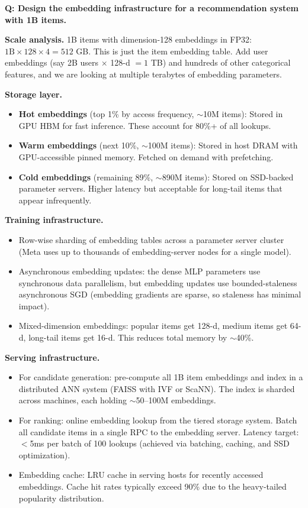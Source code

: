 \begin{interviewq}
\textbf{Q: Design the embedding infrastructure for a recommendation system with 1B items.}

 \quad {} \quad \badgefreq{\freqlow}

\stronganswer

\textbf{Scale analysis.} 1B items with dimension-128 embeddings in FP32: $1\text{B} \times 128 \times 4 = 512$ GB. This is just the item embedding table. Add user embeddings (say 2B users $\times$ 128-d $= 1$ TB) and hundreds of other categorical features, and we are looking at multiple terabytes of embedding parameters.

\textbf{Storage layer.}
\begin{itemize}
    \item \textbf{Hot embeddings} (top 1\% by access frequency, $\sim$10M items): Stored in GPU HBM for fast inference. These account for 80\%+ of all lookups.
    \item \textbf{Warm embeddings} (next 10\%, $\sim$100M items): Stored in host DRAM with GPU-accessible pinned memory. Fetched on demand with prefetching.
    \item \textbf{Cold embeddings} (remaining 89\%, $\sim$890M items): Stored on SSD-backed parameter servers. Higher latency but acceptable for long-tail items that appear infrequently.
\end{itemize}

\textbf{Training infrastructure.}
\begin{itemize}
    \item Row-wise sharding of embedding tables across a parameter server cluster (Meta uses up to thousands of embedding-server nodes for a single model).
    \item Asynchronous embedding updates: the dense MLP parameters use synchronous data parallelism, but embedding updates use bounded-staleness asynchronous SGD (embedding gradients are sparse, so staleness has minimal impact).
    \item Mixed-dimension embeddings: popular items get 128-d, medium items get 64-d, long-tail items get 16-d. This reduces total memory by $\sim$40\%.
\end{itemize}

\textbf{Serving infrastructure.}
\begin{itemize}
    \item For candidate generation: pre-compute all 1B item embeddings and index in a distributed ANN system (FAISS with IVF or ScaNN). The index is sharded across machines, each holding $\sim$50--100M embeddings.
    \item For ranking: online embedding lookup from the tiered storage system. Batch all candidate items in a single RPC to the embedding server. Latency target: $<$5ms per batch of 100 lookups (achieved via batching, caching, and SSD optimization).
    \item Embedding cache: LRU cache in serving hosts for recently accessed embeddings. Cache hit rates typically exceed 90\% due to the heavy-tailed popularity distribution.
\end{itemize}


\end{interviewq}
